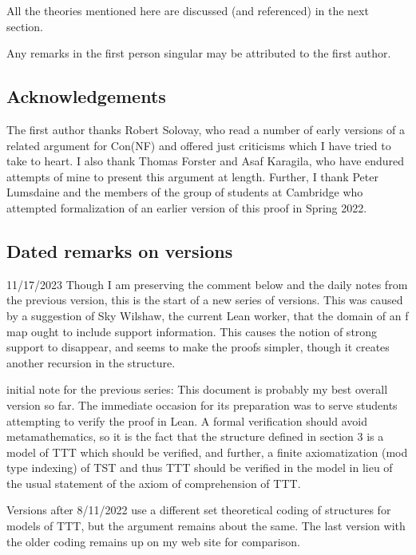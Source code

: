 \documentclass[112pt]{article}
\begin{document}
All the theories mentioned here are discussed (and referenced) in the next section.

Any remarks in the first person singular may be attributed to the first author.

\subsection{Acknowledgements}

The first author thanks Robert Solovay, who read a number of early versions of a related argument for Con(NF) and offered just criticisms which I have tried to take to heart.  I also thank Thomas Forster and Asaf Karagila, who have endured attempts of mine to present this argument at length.  Further, I thank Peter Lumsdaine
and the members of the group of students at Cambridge who attempted formalization of an earlier version of this proof in Spring 2022.

\subsection{Dated remarks on versions}

11/17/2023  Though I am preserving the comment below and the daily notes from the previous version, this is the start of a new series of versions.  This was caused by a suggestion of Sky Wilshaw, the current Lean worker, that the domain of an f map ought to include support information.  This causes the notion of strong support to disappear, and seems to 
make the proofs simpler, though it creates another recursion in the structure.

initial note for the previous series:  This document is probably my best overall version so far.  The immediate occasion for its preparation was to serve students attempting to verify the proof in Lean.  A formal verification should avoid metamathematics, so it is the fact that the structure defined in section 3 is a model of TTT which should be verified, and further, a finite axiomatization (mod type indexing) of TST and thus TTT should be verified in the model in lieu of the usual statement of the axiom of comprehension of TTT.

Versions after 8/11/2022 use a different set theoretical coding of structures for models of TTT, but the argument remains about the same.  The last version with the older coding remains up on my web site for comparison.
\end{document}
